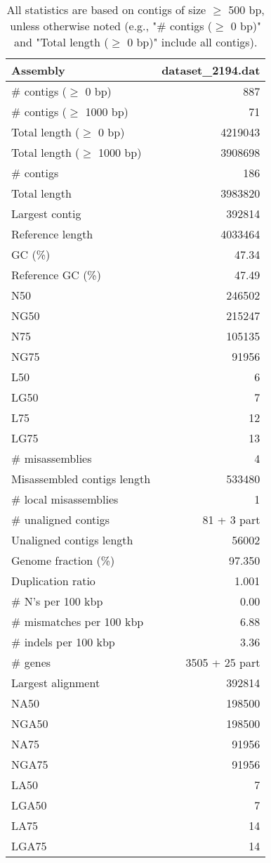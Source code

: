 \documentclass[12pt,a4paper]{article}
\begin{document}
\begin{table}[ht]
\begin{center}
\caption{All statistics are based on contigs of size $\geq$ 500 bp, unless otherwise noted (e.g., "\# contigs ($\geq$ 0 bp)" and "Total length ($\geq$ 0 bp)" include all contigs).}
\begin{tabular}{|l*{1}{|r}|}
\hline
Assembly & dataset\_2194.dat \\ \hline
\# contigs ($\geq$ 0 bp) & 887 \\ \hline
\# contigs ($\geq$ 1000 bp) & 71 \\ \hline
Total length ($\geq$ 0 bp) & 4219043 \\ \hline
Total length ($\geq$ 1000 bp) & 3908698 \\ \hline
\# contigs & 186 \\ \hline
Total length & 3983820 \\ \hline
Largest contig & 392814 \\ \hline
Reference length & 4033464 \\ \hline
GC (\%) & 47.34 \\ \hline
Reference GC (\%) & 47.49 \\ \hline
N50 & 246502 \\ \hline
NG50 & 215247 \\ \hline
N75 & 105135 \\ \hline
NG75 & 91956 \\ \hline
L50 & 6 \\ \hline
LG50 & 7 \\ \hline
L75 & 12 \\ \hline
LG75 & 13 \\ \hline
\# misassemblies & 4 \\ \hline
Misassembled contigs length & 533480 \\ \hline
\# local misassemblies & 1 \\ \hline
\# unaligned contigs & 81 + 3 part \\ \hline
Unaligned contigs length & 56002 \\ \hline
Genome fraction (\%) & 97.350 \\ \hline
Duplication ratio & 1.001 \\ \hline
\# N's per 100 kbp & 0.00 \\ \hline
\# mismatches per 100 kbp & 6.88 \\ \hline
\# indels per 100 kbp & 3.36 \\ \hline
\# genes & 3505 + 25 part \\ \hline
Largest alignment & 392814 \\ \hline
NA50 & 198500 \\ \hline
NGA50 & 198500 \\ \hline
NA75 & 91956 \\ \hline
NGA75 & 91956 \\ \hline
LA50 & 7 \\ \hline
LGA50 & 7 \\ \hline
LA75 & 14 \\ \hline
LGA75 & 14 \\ \hline
\end{tabular}
\end{center}
\end{table}
\end{document}
